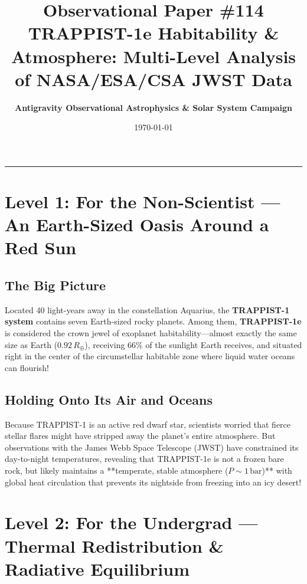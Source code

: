 \documentclass[11pt,a4paper]{article}
\title{\Huge \textbf{Observational Paper \#114}\\ \Large TRAPPIST-1e Habitability \& Atmosphere: Multi-Level Analysis of NASA/ESA/CSA JWST Data}
\author{\textbf{Antigravity Observational Astrophysics \& Solar System Campaign}}
\date{\today}
\begin{document}
\maketitle

\vspace{-1em}
\begin{center}
\rule{\textwidth}{1.5pt}
\end{center}

\section*{Level 1: For the Non-Scientist — An Earth-Sized Oasis Around a Red Sun}

\subsection*{The Big Picture}
Located 40 light-years away in the constellation Aquarius, the \textbf{TRAPPIST-1 system} contains seven Earth-sized rocky planets. Among them, \textbf{TRAPPIST-1e} is considered the crown jewel of exoplanet habitability—almost exactly the same size as Earth ($0.92\,R_\oplus$), receiving $66\%$ of the sunlight Earth receives, and situated right in the center of the circumstellar habitable zone where liquid water oceans can flourish!

\subsection*{Holding Onto Its Air and Oceans}
Because TRAPPIST-1 is an active red dwarf star, scientists worried that fierce stellar flares might have stripped away the planet's entire atmosphere. But observations with the James Webb Space Telescope (JWST) have constrained its day-to-night temperatures, revealing that TRAPPIST-1e is not a frozen bare rock, but likely maintains a **temperate, stable atmosphere ($P \sim 1\,\text{bar}$)** with global heat circulation that prevents its nightside from freezing into an icy desert!

\newpage

\section*{Level 2: For the Undergrad — Thermal Redistribution \& Radiative Equilibrium}
\end{document}
